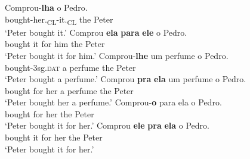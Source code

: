 \documentclass[output=paper,colorlinks,citecolor=brown]{langscibook}
\begin{document}
\ea\label{ex:03:kato:7} %
   \ea\label{ex:03:kato:7a}
 \gll Comprou-\textbf{lha }           o  Pedro. \\
     bought-her.\textsubscript{CL}-it.\textsubscript{CL}    the Peter     \\ 	
     \glt ‘Peter bought it.’%
   \ex\label{ex:03:kato:7b}
 \gll Comprou \textbf{ela} \textbf{para} \textbf{ele}   o Pedro. \\
           bought     it   for     him the Peter	\\ 
           \glt ‘Peter bought it for him.’ 
    \ex\label{ex:03:kato:7c}
 \gll Comprou-\textbf{lhe}       um perfume   o Pedro.\\
           bought-3sg.\textsc{dat}   a     perfume     the Peter	\\ 
           \glt ‘Peter bought a perfume.’ 
    \ex\label{ex:03:kato:7d}
 \gll Comprou \textbf{pra} \textbf{ela} um perfume  o  Pedro. \\
    bought     for  her  a   perfume    the Peter\\ 
    \glt ‘Peter bought her a perfume.’ 
    \ex\label{ex:03:kato:7e}
 \gll Comprou-\textbf{o}  para ela  o   Pedro. \\
           bought  for her the Peter 	\\	
           \glt ‘Peter bought it for her.’ 
    \ex\label{ex:03:kato:7f}
 \gll Comprou \textbf{ele} \textbf{pra} \textbf{ela} o Pedro. \\
           bought     it   for     her the Peter	\\
           \glt ‘Peter bought it for her.’	
   \z
\z
\end{document}
